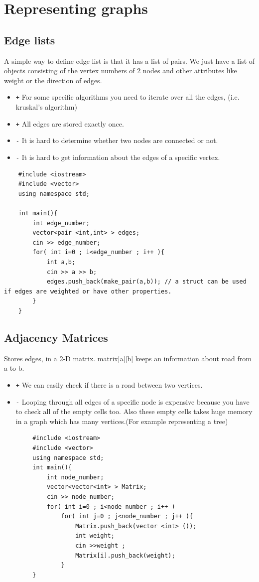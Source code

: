 \documentclass[12pt]{article}
\begin{document}
\section{Representing graphs}
    \subsection{Edge lists}
        A simple way to define edge list is that it has a list of pairs. We just have a list of objects consisting of the vertex numbers of 2 nodes and other attributes like weight or the direction of edges.
        \begin{itemize}
             \item \texttt + For some specific algorithms you need to iterate over all the edges, (i.e. kruskal's algorithm)
             \item \texttt + All edges are stored exactly once.
             \item \texttt - It is hard to determine whether two nodes are connected or not.
             \item \texttt - It is hard to get information about the edges of a specific vertex.
         \end{itemize}
    \begin{verbatim}
    #include <iostream>
    #include <vector>
    using namespace std;
    
    int main(){
        int edge_number;
        vector<pair <int,int> > edges;
        cin >> edge_number;
        for( int i=0 ; i<edge_number ; i++ ){
            int a,b;
            cin >> a >> b;
            edges.push_back(make_pair(a,b)); // a struct can be used if edges are weighted or have other properties.
        }
    }
    \end{verbatim}
    \subsection{Adjacency Matrices}
        Stores edges, in a 2-D matrix. matrix[a][b] keeps an information about road from a to b. 
        \begin{itemize}
             \item \texttt + We can easily check if there is a road between two vertices.
             \item \texttt - Looping through all edges of a specific node is expensive because you have to check all of the empty cells too. Also these empty cells takes huge memory in a graph which has many vertices.(For example representing a tree)
         \end{itemize}
        \begin{verbatim}
        #include <iostream>
        #include <vector>
        using namespace std;
        int main(){
            int node_number;
            vector<vector<int> > Matrix;
            cin >> node_number;
            for( int i=0 ; i<node_number ; i++ )
                for( int j=0 ; j<node_number ; j++ ){
                    Matrix.push_back(vector <int> ());
                    int weight;
                    cin >>weight ;
                    Matrix[i].push_back(weight);
                }
        }
        \end{verbatim}
\end{document}
